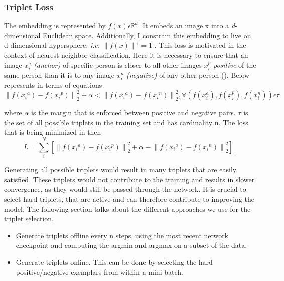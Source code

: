 \documentclass[a4paper,12pt, twoside]{NITKReport}
\begin{document}
\subsubsection{Triplet Loss}
\par The embedding is represented by $ f(x) \epsilon \mathbb{R}^{d}$. It embeds an image x into a \textit{d}-dimensional Euclidean space. Additionally, I constrain this embedding to live on d-dimensional hypersphere, \textit{i.e.} $\left \|f(x)  \right \|^{_{2}} =1$ . This loss is motivated in the context of nearest neighbor classification. Here it is necessary to ensure that an image $x_{i}^{a}$ \textit{(anchor)} of specific person is closer to all other images $x_{i}^{p}$ \textit{positive} of the same person than it is to any image $x_{i}^{n}$ \textit{(negative)} of any other person (\cite{schroff2015facenet}). Below represents in terms of equations
\begin{equation}
\left \| f(x{_{i}}^{a})-f(x{_{i}}^{p})\right \|_{2}^{2} + \alpha < \left \| f(x{_{i}}^{a})-f(x{_{i}}^{n})\right \|_{2}^{2}, \forall (f(x_{i}^{a}),f(x_{i}^{p}),f(x_{i}^{n}))\epsilon \tau 
\end{equation}

where $\alpha$ is the margin that is enforced between positive and negative pairs.
$\tau$ is the set of all possible triplets in the training set and has cardinality n. The loss that is being minimized in then 
\begin{equation}
L = \sum_{i}^{N}[\left \| f(x{_{i}}^{a})-f(x{_{i}}^{p})\right \|_{2}^{2} + \alpha - \left \| f(x{_{i}}^{a})-f(x{_{i}}^{n})\right \|_{2}^{2}]_{+}
\end{equation}

Generating all possible triplets would result in many triplets that are easily satisfied. These triplets would not contribute to the training and results in slower convergence, as they would still be passed  through the network.  It is crucial to select hard triplets, that are active and can therefore contribute to improving the model.  The following section talks about the different approaches we use for the triplet selection.
\begin{itemize}
\item Generate triplets offline every n steps, using the most recent network checkpoint and computing the argmin and argmax on a subset of the data.
\item Generate triplets online.  This can be done by selecting the hard positive/negative exemplars from within a mini-batch.
\end{itemize}
\end{document}
